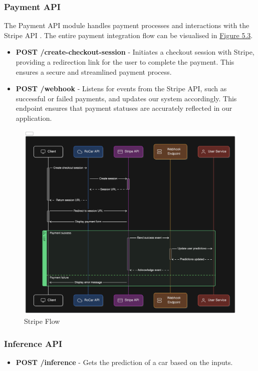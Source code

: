 \subsubsection{Payment API}
The Payment API module handles payment processes and interactions with the Stripe API \cite{stripe_api}. The entire payment integration flow can be visualised in \hyperref[fig:backend-stripe]{Figure 5.3}.

\begin{itemize}
\item \textbf{POST /create-checkout-session} - Initiates a checkout session with Stripe, providing a redirection link for the user to complete the payment. This ensures a secure and streamlined payment process.
\item \textbf{POST /webhook} - Listens for events from the Stripe API, such as successful or failed payments, and updates our system accordingly. This endpoint ensures that payment statuses are accurately reflected in our application.
\end{itemize}

\begin{figure}[ht]
    \centering
    \includegraphics[width=0.7\linewidth]{images/webapp/backend/stripe.png}
    \caption{Stripe Flow}
    \label{fig:backend-stripe}
\end{figure}

\subsubsection{Inference API}
\begin{itemize}
    \item \textbf{POST /inference} - Gets the prediction of a car based on the inputs.
\end{itemize}

